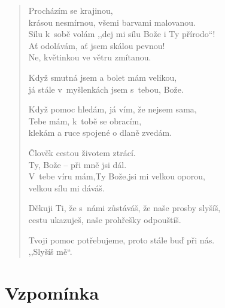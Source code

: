 \begin{verse}
Procházím se krajinou, \\ 
krásou nesmírnou, všemi barvami malovanou. \\
Sílu k sobě volám ,,dej mi sílu Bože i Ty přírodo``! \\
Ať odolávám, ať jsem skálou pevnou! \\
Ne, květinkou ve větru zmítanou.

\medskip

Když smutná jsem a bolet mám velikou, \\
já stále v myšlenkách jsem s tebou, Bože.

\medskip

Když pomoc hledám, já vím, že nejsem sama, \\
Tebe mám, k tobě se obracím, \\
klekám a ruce spojené o dlaně zvedám.

\medskip

Člověk cestou životem ztrácí. \\
Ty, Bože -- při mně jsi dál. \\
V tebe víru mám,Ty Bože,jsi mi velkou oporou, \\
velkou sílu mi dáváš.

\medskip

Děkuji Ti, že s námi zůstáváš, že naše prosby slyšíš, \\
cestu ukazuješ, naše prohřešky odpouštíš.

\medskip

Tvoji pomoc potřebujeme, proto stále buď při nás. \\
,,Slyšíš mě``.
\end{verse}


\section{Vzpomínka}

